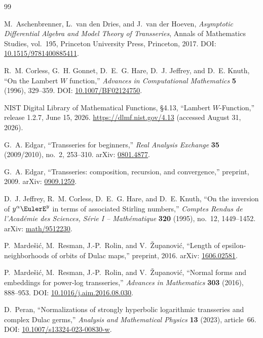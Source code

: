 \documentclass[11pt,openany]{book}
\theoremstyle{definition}
\theoremstyle{plain}
\theoremstyle{remark}
\begin{document}
\begin{thebibliography}{99}

M.~Aschenbrenner, L.~van den Dries, and J.~van der Hoeven,
\emph{Asymptotic Differential Algebra and Model Theory of Transseries},
Annals of Mathematics Studies, vol.~195, Princeton University Press,
Princeton, 2017.
\newblock DOI: \href{https://doi.org/10.1515/9781400885411}{10.1515/9781400885411}.

R.~M. Corless, G.~H. Gonnet, D.~E.~G. Hare, D.~J. Jeffrey, and D.~E. Knuth,
``On the Lambert $W$ function,''
\emph{Advances in Computational Mathematics} \textbf{5} (1996), 329--359.
\newblock DOI: \href{https://doi.org/10.1007/BF02124750}{10.1007/BF02124750}.

NIST Digital Library of Mathematical Functions,
\S4.13, ``Lambert $W$-Function,'' release 1.2.7, June 15, 2026.
\newblock \url{https://dlmf.nist.gov/4.13} (accessed August 31, 2026).

G.~A. Edgar,
``Transseries for beginners,''
\emph{Real Analysis Exchange} \textbf{35} (2009/2010), no.~2, 253--310.
\newblock arXiv: \href{https://arxiv.org/abs/0801.4877}{0801.4877}.

G.~A. Edgar,
``Transseries: composition, recursion, and convergence,''
preprint, 2009.
\newblock arXiv: \href{https://arxiv.org/abs/0909.1259}{0909.1259}.

D.~J. Jeffrey, R.~M. Corless, D.~E.~G. Hare, and D.~E. Knuth,
``On the inversion of $y^\alpha \EulerE^y$ in terms of associated Stirling
numbers,''
\emph{Comptes Rendus de l'Acad\'emie des Sciences, S\'erie I -- Math\'ematique}
\textbf{320} (1995), no.~12, 1449--1452.
\newblock arXiv: \href{https://arxiv.org/abs/math/9512230}{math/9512230}.

P.~Marde\v{s}i\'c, M.~Resman, J.-P.~Rolin, and V.~\v{Z}upanovi\'c,
``Length of epsilon-neighborhoods of orbits of Dulac maps,''
preprint, 2016.
\newblock arXiv: \href{https://arxiv.org/abs/1606.02581}{1606.02581}.

P.~Marde\v{s}i\'c, M.~Resman, J.-P.~Rolin, and V.~\v{Z}upanovi\'c,
``Normal forms and embeddings for power-log transseries,''
\emph{Advances in Mathematics} \textbf{303} (2016), 888--953.
\newblock DOI:
\href{https://doi.org/10.1016/j.aim.2016.08.030}{10.1016/j.aim.2016.08.030}.

D.~Peran,
``Normalizations of strongly hyperbolic logarithmic transseries and complex
Dulac germs,''
\emph{Analysis and Mathematical Physics} \textbf{13} (2023), article~66.
\newblock DOI:
\href{https://doi.org/10.1007/s13324-023-00830-w}{10.1007/s13324-023-00830-w}.


\end{thebibliography}
\end{document}
